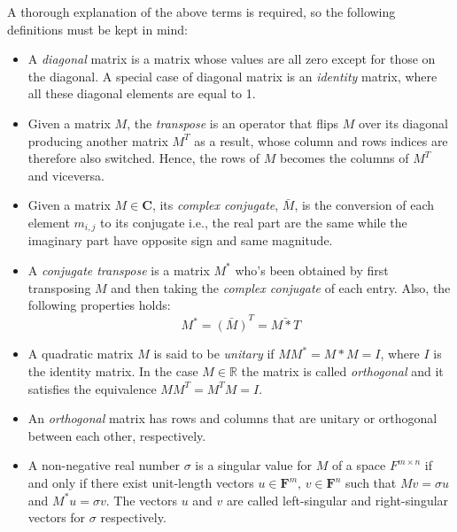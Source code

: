 A thorough explanation of the above terms is required, so the following definitions must be kept in mind: 
\begin{itemize} 
 \item A \emph{diagonal} matrix is a matrix whose values are all zero except for those on the diagonal. A special case of diagonal matrix is an \emph{identity} matrix, where all these diagonal elements are equal to 1. 
 
 \item Given a matrix $M$, the \emph{transpose} is an operator that flips $M$ over its diagonal producing another matrix $M^T$ as a result, whose column and rows indices are therefore also switched. Hence, the rows of $M$ becomes the columns of $M^T$ and viceversa. 
 
 \item Given a matrix $M \in \mathbf{C}$, its \emph{complex conjugate}, $\bar{M}$, is the conversion of each element $m_{i,j}$ to its conjugate i.e., the real part are the same while the imaginary part have opposite sign and same magnitude. 
 
 \item A \emph{conjugate transpose} is a matrix $M^*$ who's been obtained by first transposing $M$ and then taking the \emph{complex conjugate} of each entry. Also, the following properties holds: 
 		$$
 		M^* = \bar{(M)}^T = \bar{M*T}
 		$$  
 
 \item A quadratic matrix $M$ is said to be \emph{unitary} if $MM^* = M*M = I$, where $I$ is the identity matrix. In the case $M \in \mathbb{R}$ the matrix is called \emph{orthogonal} and it satisfies the equivalence $MM^T = M^TM = I$. 
 
 \item An \emph{orthogonal} matrix has rows and columns that are unitary or orthogonal between each other, respectively. 
 
 \item A non-negative real number $\sigma$ is a singular value for $M$ of a space $F^{m \times n}$ if and only if there exist unit-length vectors  $u \in \mathbf{F}^m, \, v \in \mathbf{F}^n$ such that $Mv=\sigma u$ and $M^*u=\sigma v$. The vectors $u$ and $v$ are called left-singular and right-singular vectors for $\sigma$ respectively. 

\end{itemize}

